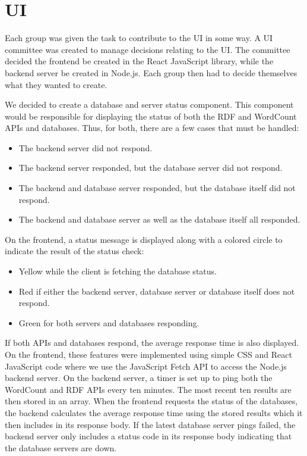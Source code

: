 \section{UI}\label{UI}
Each group was given the task to contribute to the \knox{} UI in some way. 
A UI committee was created to manage decisions relating to the UI. 
The committee decided the frontend be created in the React JavaScript library\cite{Reactjs}, while the backend server be created in Node.js\cite{Nodejs}.
Each group then had to decide themselves what they wanted to create. 


We decided to create a database and server status component. 
This component would be responsible for displaying the status of both the RDF and WordCount APIs and databases. 
Thus, for both, there are a few cases that must be handled:
\begin{itemize}
	\item The backend server did not respond.
	\item The backend server responded, but the database server did not respond.
	\item The backend and database server responded, but the database itself did not respond.
	\item The backend and database server as well as the database itself all responded.
\end{itemize}

On the frontend, a status message is displayed along with a colored circle to indicate the result of the status check:
\begin{itemize}
	\item Yellow while the client is fetching the database status.
	\item Red if either the backend server, database server or database itself does not respond.
	\item Green for both servers and databases responding.
\end{itemize}
If both APIs and databases respond, the average response time is also displayed.
On the frontend, these features were implemented using simple CSS and React JavaScript code where we use the JavaScript Fetch API to access the Node.js backend server.
On the backend server, a timer is set up to ping both the WordCount and RDF APIs every ten minutes.
The most recent ten results are then stored in an array.
When the frontend requests the status of the databases, the backend calculates the average response time using the stored results which it then includes in its response body.
If the latest database server pings failed, the backend server only includes a status code in its response body indicating that the database servers are down.



